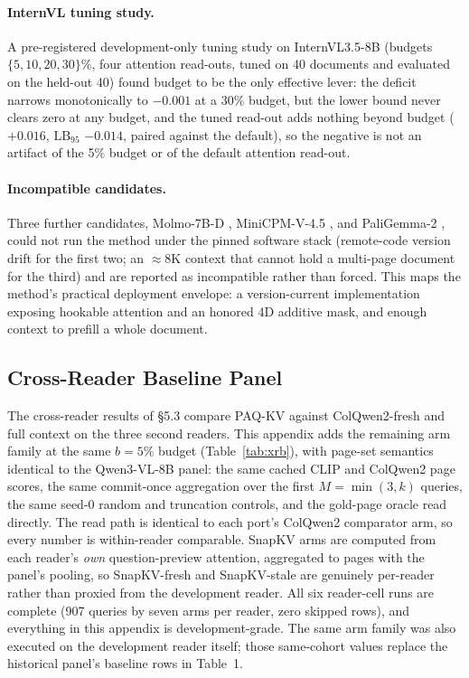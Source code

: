 \documentclass[letterpaper]{article} %
\newcommand{\paqc}{\textsc{PAQ-KV}}
\newcommand{\lb}{\mathrm{LB}_{95}}
\begin{document}
\paragraph{InternVL tuning study.} A pre-registered development-only tuning
study on InternVL3.5-8B (budgets $\{5,10,20,30\}\%$, four attention
read-outs, tuned on 40 documents and evaluated on the held-out 40) found
budget to be the only effective lever: the deficit narrows monotonically to
$-0.001$ at a 30\% budget, but the lower bound never clears zero at any
budget, and the tuned read-out adds nothing beyond budget ($+0.016$, $\lb$
$-0.014$, paired against the default), so the negative is not an
artifact of the 5\% budget or of the default attention read-out.

\paragraph{Incompatible candidates.} Three further candidates, Molmo-7B-D
\citep{deitke2024molmo}, MiniCPM-V-4.5 \citep{yu2026minicpmv45}, and
PaliGemma-2 \citep{steiner2024paligemma2}, could not run the method under
the pinned software stack (remote-code version drift for the first two; an
${\approx}8$K context that cannot hold a multi-page document for the third)
and are reported as incompatible rather than forced. This maps the method's
practical deployment envelope: a version-current implementation exposing
hookable attention and an honored 4D additive mask, and enough context to
prefill a whole document.

\subsection{Cross-Reader Baseline Panel}\label{app:xrb}

The cross-reader results of \S5.3 compare \paqc{}
against ColQwen2-fresh and full context on the three second readers. This
appendix adds the remaining arm family at the same $b=5\%$ budget
(Table~\ref{tab:xrb}), with page-set semantics identical to the Qwen3-VL-8B
panel: the same cached CLIP and ColQwen2 page scores, the same commit-once
aggregation over the first $M{=}\min(3,k)$ queries, the same seed-0 random
and truncation controls, and the gold-page oracle read directly. The read
path is identical to each port's ColQwen2 comparator arm, so every number is
within-reader comparable. SnapKV arms are computed from each reader's
\emph{own} question-preview attention, aggregated to pages with the panel's
pooling, so SnapKV-fresh and SnapKV-stale are genuinely per-reader rather
than proxied from the development reader. All six reader-cell runs are
complete (907 queries by seven arms per reader, zero skipped rows), and
everything in this appendix is development-grade. The same arm family was
also executed on the development reader itself; those same-cohort values
replace the historical panel's baseline rows in Table~1.
\end{document}
